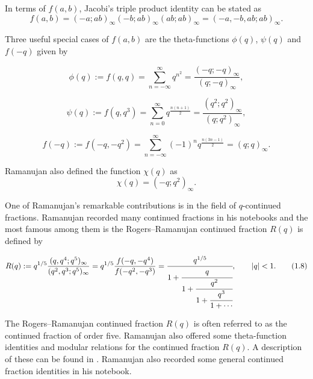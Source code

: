 \documentclass[11pt,a4paper]{article}
\numberwithin{equation}{section}
\theoremstyle{plain}
\begin{document}
	In terms of $f(a,b)$, Jacobi’s triple product identity \cite[p.~35, Entry 19]{Berndt}
	can be stated as
	\begin{equation}
		f(a,b) = (-a;ab)_\infty (-b;ab)_\infty (ab;ab)_\infty
		= (-a, -b, ab; ab)_\infty.
		\tag{1.3}
	\end{equation}
	
	Three useful special cases of $f(a,b)$ are the theta-functions $\phi(q)$, $\psi(q)$ and $f(-q)$ 
	\cite[p.~36, Entry 22(i)--(iii)]{Berndt} given by
	
	\begin{equation}
		\phi(q) := f(q,q) = \sum_{n=-\infty}^{\infty} q^{n^2}
		= \frac{(-q; -q)_\infty}{(q; -q)_\infty},
		\tag{1.4}
	\end{equation}
	
	\begin{equation}
		\psi(q) := f(q,q^3) = \sum_{n=0}^{\infty} q^{\frac{n(n+1)}{2}}
		= \frac{(q^2; q^2)_\infty}{(q; q^2)_\infty},
		\tag{1.5}
	\end{equation}
	
	\begin{equation}
		f(-q) := f(-q,-q^2) = \sum_{n=-\infty}^{\infty} (-1)^n q^{\frac{n(3n-1)}{2}}
		= (q;q)_\infty.
		\tag{1.6}
	\end{equation}
	
	Ramanujan also defined the function $\chi(q)$ \cite[p.~36, Entry 22(iv)]{Berndt} as
	\begin{equation}
		\chi(q) = (-q; q^2)_\infty.
		\tag{1.7}
	\end{equation}
	
	One of Ramanujan’s remarkable contributions is in the field of $q$-continued fractions. 
	Ramanujan recorded many continued fractions in his notebooks and the most famous among them 
	is the Rogers--Ramanujan continued fraction $R(q)$ is defined by
	
	\begin{equation}
		R(q) := q^{1/5}\frac{(q,q^{4};q^{5})_{\infty}}{(q^{2},q^{3};q^{5})_{\infty}}
		= q^{1/5}\frac{f(-q,-q^{4})}{f(-q^{2},-q^{3})}
		= \cfrac{q^{1/5}}{1+\cfrac{q}{1+\cfrac{q^{2}}{1+\cfrac{q^{3}}{1+\cdots}}}},
		\qquad |q|<1.
		\tag{1.8}
	\end{equation}
	
	The Rogers--Ramanujan continued fraction $R(q)$ is often referred to as the 
	continued fraction of order five. Ramanujan also offered some theta-function 
	identities and modular relations for the continued fraction $R(q)$. A description
	of these can be found in \cite{Berndt}. Ramanujan also recorded some general 
	continued fraction identities in his notebook. 
	
\end{document}
